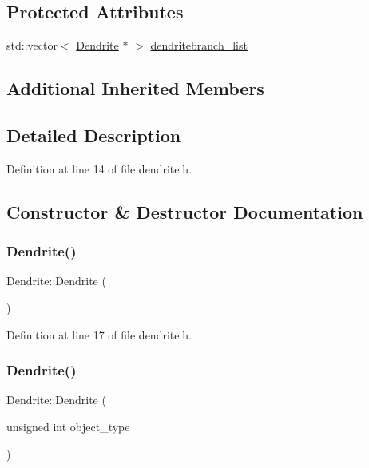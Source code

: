 \subsection*{Protected Attributes}
\begin{DoxyCompactItemize}
\item 
std\+::vector$<$ \hyperlink{class_dendrite}{Dendrite} $\ast$ $>$ \hyperlink{class_dendrite_a1d57708bfa57443d3fa0358984b4c761}{dendritebranch\+\_\+list}
\end{DoxyCompactItemize}
\subsection*{Additional Inherited Members}


\subsection{Detailed Description}


Definition at line 14 of file dendrite.\+h.



\subsection{Constructor \& Destructor Documentation}
\mbox{\label{class_dendrite_a0a35047fcf3dad2f81be348499e32337}} 
\subsubsection{\texorpdfstring{Dendrite()}{Dendrite()}\hspace{0.1cm}{\footnotesize\ttfamily [1/4]}}
{\footnotesize\ttfamily Dendrite\+::\+Dendrite (\begin{DoxyParamCaption}{ }\end{DoxyParamCaption})\hspace{0.3cm}{\ttfamily [inline]}}



Definition at line 17 of file dendrite.\+h.

\mbox{\label{class_dendrite_ae702e9fd351be8dc3a09afa0ed431c3b}} 
\subsubsection{\texorpdfstring{Dendrite()}{Dendrite()}\hspace{0.1cm}{\footnotesize\ttfamily [2/4]}}
{\footnotesize\ttfamily Dendrite\+::\+Dendrite (\begin{DoxyParamCaption}\item[{unsigned int}]{object\+\_\+type }\end{DoxyParamCaption})\hspace{0.3cm}{\ttfamily [inline]}}




